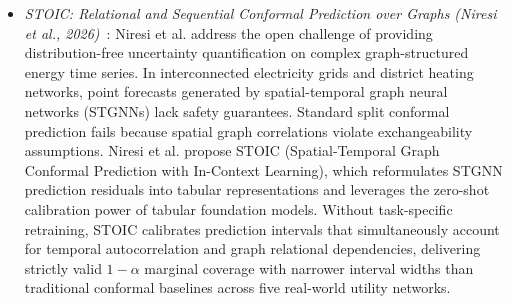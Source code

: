 \begin{itemize}[leftmargin=*]
    \item \emph{STOIC: Relational and Sequential Conformal Prediction over Graphs (Niresi et al., 2026)}~\cite{niresi2026graphconformal}: Niresi et al. address the open challenge of providing distribution-free uncertainty quantification on complex graph-structured energy time series. In interconnected electricity grids and district heating networks, point forecasts generated by spatial-temporal graph neural networks (STGNNs) lack safety guarantees. Standard split conformal prediction fails because spatial graph correlations violate exchangeability assumptions. Niresi et al. propose STOIC (Spatial-Temporal Graph Conformal Prediction with In-Context Learning), which reformulates STGNN prediction residuals into tabular representations and leverages the zero-shot calibration power of tabular foundation models. Without task-specific retraining, STOIC calibrates prediction intervals that simultaneously account for temporal autocorrelation and graph relational dependencies, delivering strictly valid $1-\alpha$ marginal coverage with narrower interval widths than traditional conformal baselines across five real-world utility networks.
\end{itemize}

